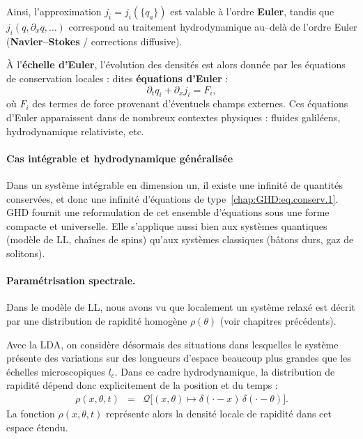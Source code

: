 \smallskip

Ainsi, l'approximation $j_i=j_i(\{q_a\})$ est valable à l'ordre {\bf Euler}, tandis que $j_i(q,\partial_x q,\dots)$ correspond au traitement hydrodynamique au–delà de l'ordre Euler ({\bf Navier--Stokes} / corrections diffusive).

\smallskip

À l'{\bf échelle d’Euler}, l'évolution des densités est alors donnée par les équations de conservation locales : dites {\bf équations d’Euler} :
\begin{equation}\label{chap:GHD:eq.conserv.1}
	\partial_t q_i + \partial_x j_i = F_i,
\end{equation}
où $F_i$ des termes de force provenant d’éventuels champs externes. 
Ces équations d’Euler apparaissent dans de nombreux contextes physiques : fluides galiléens, hydrodynamique relativiste, etc.

\paragraph*{Cas intégrable et hydrodynamique généralisée}  
Dans un système intégrable en dimension un, il existe une infinité de quantités conservées, et donc une infinité d’équations de type~\eqref{chap:GHD:eq.conserv.1}. \gls{GHD} fournit une reformulation de cet ensemble d’équations sous une forme compacte et universelle. Elle s’applique aussi bien aux systèmes quantiques (modèle de \acrlong{LL}, chaînes de spins) qu’aux systèmes classiques (bâtons durs, gaz de solitons).


\paragraph*{Paramétrisation spectrale.}  
Dans le modèle de \gls{LL}, nous avons vu que localement un système relaxé est décrit par une distribution de rapidité homogène $\rho(\theta)$ (voir chapitres précédents).  

Avec la \gls{LDA}, on considère désormais des situations dans lesquelles le système présente des variations sur des longueurs d’espace beaucoup plus grandes que les échelles microscopiques $l_c$. Dans ce cadre hydrodynamique, la distribution de rapidité dépend donc explicitement de la position et du temps :  
\begin{eqnarray*}
\rho(x,\theta,t) & = & \mathcal{Q}\big[ (x,\theta) \mapsto \delta(\cdot - x) \, \delta(\cdot - \theta) \big].
\end{eqnarray*}
La fonction $\rho(x,\theta,t)$ représente alors la densité locale de rapidité dans cet espace étendu.



